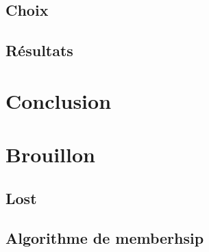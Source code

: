 	\section{Choix}\label{sec:choix}
	\section{Résultats}\label{sec:res}

	\chapter{Conclusion}\label{ch:ccl}

	\chapter{Brouillon}
	\section{Lost}
	\section{Algorithme de memberhsip}\label{sec:membership_algo}

	\newpage
	
	


